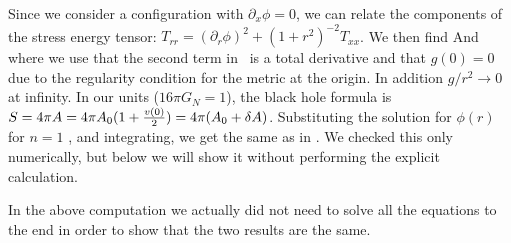 Since we consider a configuration with
  $\partial_x \phi=0$,  we can relate the components of the stress energy tensor: $T_{rr}=(\partial_r \phi)^2 +  (1+r^2)^{-2}  T_{xx}$. We then find
\eqn{}
And
\eqn{}
where we use that the second term in \veq\ is a total derivative and that $g(0) =0$ due to the regularity condition
for the metric at the origin.  In addition $g/r^2 \to 0$ at infinity.
In our units ($16 \pi G_N=1$),  the black hole formula is $S=4 \pi A=4 \pi A_0(1+{ v(0)  \over 2})=4 \pi ( A_0+\delta A)$.
Substituting the solution for $\phi(r)$ for $n=1$ \solwva , and integrating, we get the same as in \entr .
We checked this only numerically, but below we will show it without performing the explicit calculation.


In the above computation we actually did not need to solve all the equations to the end in order to
show that the two results are the same.

